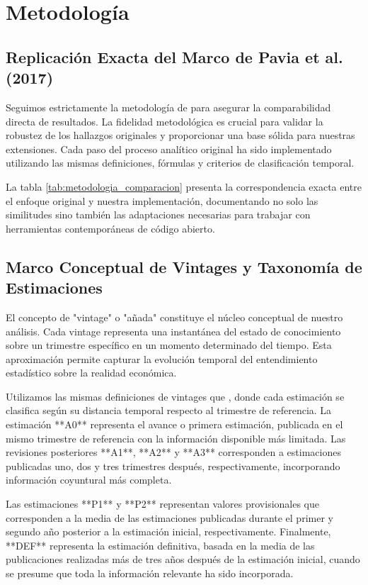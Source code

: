 \documentclass[12pt,a4paper]{article}
\begin{document}
\section{Metodología}

\subsection{Replicación Exacta del Marco de Pavia et al. (2017)}

Seguimos estrictamente la metodología de \citet{pavia2017} para asegurar la comparabilidad directa de resultados. La fidelidad metodológica es crucial para validar la robustez de los hallazgos originales y proporcionar una base sólida para nuestras extensiones. Cada paso del proceso analítico original ha sido implementado utilizando las mismas definiciones, fórmulas y criterios de clasificación temporal.

La tabla \ref{tab:metodologia_comparacion} presenta la correspondencia exacta entre el enfoque original y nuestra implementación, documentando no solo las similitudes sino también las adaptaciones necesarias para trabajar con herramientas contemporáneas de código abierto.



\subsection{Marco Conceptual de Vintages y Taxonomía de Estimaciones}

El concepto de "vintage" o "añada" constituye el núcleo conceptual de nuestro análisis. Cada vintage representa una instantánea del estado de conocimiento sobre un trimestre específico en un momento determinado del tiempo. Esta aproximación permite capturar la evolución temporal del entendimiento estadístico sobre la realidad económica.

Utilizamos las mismas definiciones de vintages que \citet{pavia2017}, donde cada estimación se clasifica según su distancia temporal respecto al trimestre de referencia. La estimación **A0** representa el avance o primera estimación, publicada en el mismo trimestre de referencia con la información disponible más limitada. Las revisiones posteriores **A1**, **A2** y **A3** corresponden a estimaciones publicadas uno, dos y tres trimestres después, respectivamente, incorporando información coyuntural más completa.

Las estimaciones **P1** y **P2** representan valores provisionales que corresponden a la media de las estimaciones publicadas durante el primer y segundo año posterior a la estimación inicial, respectivamente. Finalmente, **DEF** representa la estimación definitiva, basada en la media de las publicaciones realizadas más de tres años después de la estimación inicial, cuando se presume que toda la información relevante ha sido incorporada.
\end{document}
